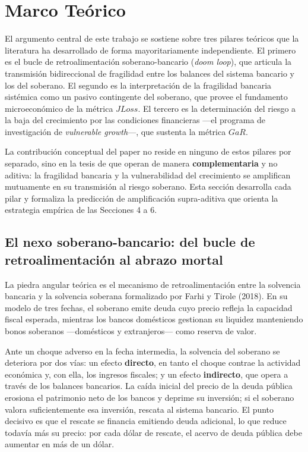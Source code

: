 \documentclass[5p,times,twocolumn,authoryear]{elsarticle}
\begin{document}
\section{Marco Teórico}

El argumento central de este trabajo se sostiene sobre tres pilares teóricos que la literatura ha desarrollado de forma mayoritariamente independiente. El primero es el bucle de retroalimentación soberano-bancario (\textit{doom loop}), que articula la transmisión bidireccional de fragilidad entre los balances del sistema bancario y los del soberano. El segundo es la interpretación de la fragilidad bancaria sistémica como un pasivo contingente del soberano, que provee el fundamento microeconómico de la métrica $JLoss$. El tercero es la determinación del riesgo a la baja del crecimiento por las condiciones financieras —el programa de investigación de \textit{vulnerable growth}—, que sustenta la métrica $GaR$.

La contribución conceptual del paper no reside en ninguno de estos pilares por separado, sino en la tesis de que operan de manera \textbf{complementaria} y no aditiva: la fragilidad bancaria y la vulnerabilidad del crecimiento se amplifican mutuamente en su transmisión al riesgo soberano. Esta sección desarrolla cada pilar y formaliza la predicción de amplificación supra-aditiva que orienta la estrategia empírica de las Secciones 4 a 6.

\subsection{El nexo soberano-bancario: del bucle de retroalimentación al abrazo mortal}

La piedra angular teórica es el mecanismo de retroalimentación entre la solvencia bancaria y la solvencia soberana formalizado por Farhi y Tirole (2018). En su modelo de tres fechas, el soberano emite deuda cuyo precio refleja la capacidad fiscal esperada, mientras los bancos domésticos gestionan su liquidez manteniendo bonos soberanos —domésticos y extranjeros— como reserva de valor.

Ante un choque adverso en la fecha intermedia, la solvencia del soberano se deteriora por dos vías: un efecto \textbf{directo}, en tanto el choque contrae la actividad económica y, con ella, los ingresos fiscales; y un efecto \textbf{indirecto}, que opera a través de los balances bancarios. La caída inicial del precio de la deuda pública erosiona el patrimonio neto de los bancos y deprime su inversión; si el soberano valora suficientemente esa inversión, rescata al sistema bancario. El punto decisivo es que el rescate se financia emitiendo deuda adicional, lo que reduce todavía más su precio: por cada dólar de rescate, el acervo de deuda pública debe aumentar en más de un dólar.
\end{document}
